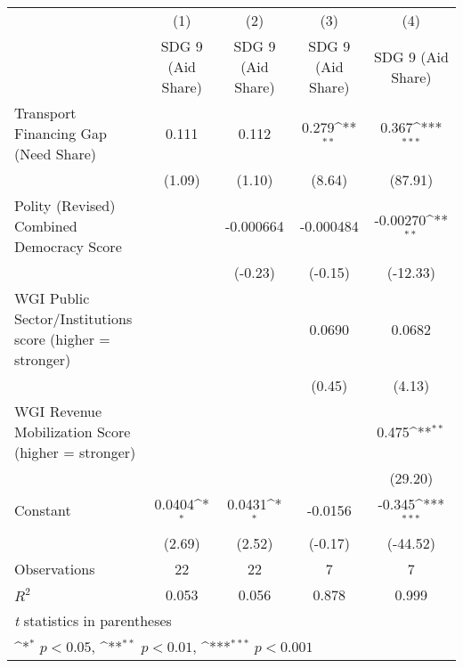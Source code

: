 {
\def\sym#1{\ifmmode^{#1}\else\(^{#1}\)\fi}
\begin{tabular}{l*{4}{c}}
\hline\hline
                &\multicolumn{1}{c}{(1)}&\multicolumn{1}{c}{(2)}&\multicolumn{1}{c}{(3)}&\multicolumn{1}{c}{(4)}\\
                &\multicolumn{1}{c}{SDG 9 (Aid Share)}&\multicolumn{1}{c}{SDG 9 (Aid Share)}&\multicolumn{1}{c}{SDG 9 (Aid Share)}&\multicolumn{1}{c}{SDG 9 (Aid Share)}\\
\hline
Transport Financing Gap (Need Share)&    0.111         &    0.112         &    0.279\sym{**} &    0.367\sym{***}\\
                &   (1.09)         &   (1.10)         &   (8.64)         &  (87.91)         \\
[1em]
Polity (Revised) Combined Democracy Score&                  &-0.000664         &-0.000484         & -0.00270\sym{**} \\
                &                  &  (-0.23)         &  (-0.15)         & (-12.33)         \\
[1em]
WGI Public Sector/Institutions score (higher = stronger)&                  &                  &   0.0690         &   0.0682         \\
                &                  &                  &   (0.45)         &   (4.13)         \\
[1em]
WGI Revenue Mobilization Score (higher = stronger)&                  &                  &                  &    0.475\sym{**} \\
                &                  &                  &                  &  (29.20)         \\
[1em]
Constant        &   0.0404\sym{*}  &   0.0431\sym{*}  &  -0.0156         &   -0.345\sym{***}\\
                &   (2.69)         &   (2.52)         &  (-0.17)         & (-44.52)         \\
\hline
Observations    &       22         &       22         &        7         &        7         \\
\(R^{2}\)       &    0.053         &    0.056         &    0.878         &    0.999         \\
\hline\hline
\multicolumn{5}{l}{\footnotesize \textit{t} statistics in parentheses}\\
\multicolumn{5}{l}{\footnotesize \sym{*} \(p<0.05\), \sym{**} \(p<0.01\), \sym{***} \(p<0.001\)}\\
\end{tabular}
}

